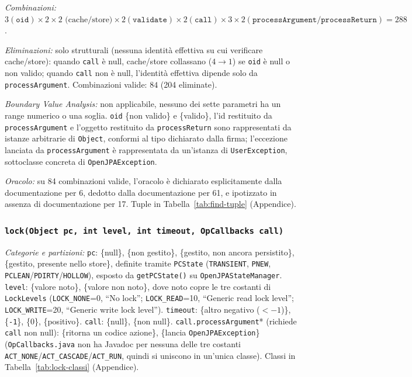 \textit{Combinazioni:} $3 (\texttt{oid}) \times 2 \times 2 \mbox{ (cache/store)} \times 2
(\texttt{validate}) \times 2 (\texttt{call}) \times 3 \times 2
(\texttt{processArgument}/\texttt{processReturn}) = 288$.

\textit{Eliminazioni:} solo strutturali (nessuna identità effettiva su cui verificare
cache/store): quando \texttt{call} è null, cache/store collassano ($4 \to 1$) se \texttt{oid} è
null o non valido; quando \texttt{call} non è null, l'identità effettiva dipende solo da
\texttt{processArgument}. Combinazioni valide: $84$ (204 eliminate).

\textit{Boundary Value Analysis:} non applicabile, nessuno dei sette parametri ha un range
numerico o una soglia. \texttt{oid} \{non valido\} e \{valido\}, l'id restituito da
\texttt{processArgument} e l'oggetto restituito da \texttt{processReturn} sono rappresentati da
istanze arbitrarie di \texttt{Object}, conformi al tipo dichiarato dalla firma; l'eccezione
lanciata da \texttt{processArgument} è rappresentata da un'istanza di \texttt{UserException},
sottoclasse concreta di \texttt{OpenJPAException}.

\textit{Oracolo:} su 84 combinazioni valide, l'oracolo è dichiarato esplicitamente dalla
documentazione per 6, dedotto dalla documentazione per 61, e ipotizzato in assenza di
documentazione per 17. Tuple in Tabella~\ref{tab:find-tuple} (Appendice).

\subsubsection{\texttt{lock(Object pc, int level, int timeout, OpCallbacks call)}}

\textit{Categorie e partizioni:} \texttt{pc}: \{null\}, \{non gestito\}, \{gestito, non ancora
persistito\}, \{gestito, presente nello store\}, definite tramite \texttt{PCState}
(\texttt{TRANSIENT}, \texttt{PNEW}, \texttt{PCLEAN}/\texttt{PDIRTY}/\texttt{HOLLOW}), esposto da
\texttt{getPCState()} su \texttt{OpenJPAStateManager}. \texttt{level}: \{valore noto\}, \{valore
non noto\}, dove noto copre le tre costanti di \texttt{LockLevels} (\texttt{LOCK\_NONE}=0, ``No
lock''; \texttt{LOCK\_READ}=10, ``Generic read lock level''; \texttt{LOCK\_WRITE}=20, ``Generic
write lock level''). \texttt{timeout}: \{altro negativo
($<-1$)\}, \{\texttt{-1}\}, \{0\}, \{positivo\}. \texttt{call}: \{null\}, \{non null\}.
\texttt{call.processArgument}* (richiede \texttt{call} non null): \{ritorna un codice azione\},
\{lancia \texttt{OpenJPAException}\} (\texttt{OpCallbacks.java} non ha Javadoc per nessuna delle
tre costanti \texttt{ACT\_NONE}/\texttt{ACT\_CASCADE}/\texttt{ACT\_RUN}, quindi si uniscono in
un'unica classe). Classi in Tabella~\ref{tab:lock-classi} (Appendice).

